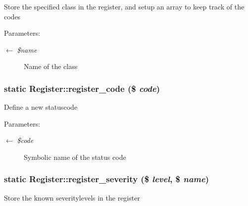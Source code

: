 Store the specified class in the register, and setup an array to keep track of the codes

\begin{Desc}
\item[Parameters:]
\begin{description}
\item[\mbox{$\leftarrow$} {\em \$name}]Name of the class \end{description}
\end{Desc}
\hypertarget{classRegister_875fd1f32f0746aa9e0e00b053c7389a}{
\subsubsection{\setlength{\rightskip}{0pt plus 5cm}static Register::register\_\-code (\$ {\em code})}}
\label{classRegister_875fd1f32f0746aa9e0e00b053c7389a}


Define a new statuscode

\begin{Desc}
\item[Parameters:]
\begin{description}
\item[\mbox{$\leftarrow$} {\em \$code}]Symbolic name of the status code \end{description}
\end{Desc}
\hypertarget{classRegister_c22a104eefa471675cb28ee20821eaad}{
\subsubsection{\setlength{\rightskip}{0pt plus 5cm}static Register::register\_\-severity (\$ {\em level}, \$ {\em name})}}
\label{classRegister_c22a104eefa471675cb28ee20821eaad}


Store the known severitylevels in the register

